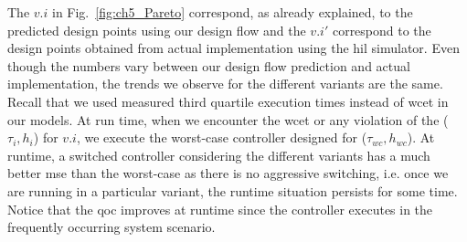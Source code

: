 The $v.i$ in Fig.~\ref{fig:ch5_Pareto} correspond, as already explained, to the predicted design points using our design flow and the $v.i'$ correspond to the design points obtained from actual implementation using the \gls{hil} simulator. Even though the numbers vary between our design flow prediction and actual implementation, the trends we observe for the different variants are the same. Recall that we used measured third quartile execution times instead of \gls{wcet} in our models. At run time, when we encounter the \gls{wcet} or any violation of the ($\tau_{i},h_{i}$) for $v.i$, we execute the worst-case controller designed for ($\tau_{wc},h_{wc}$).
At runtime, a switched controller considering the different variants has a much better \gls{mse} than the worst-case as there is no aggressive switching, i.e. once we are running in a particular variant, the runtime situation persists for some time. Notice that the \gls{qoc} improves at runtime since the controller executes in the frequently occurring system scenario.